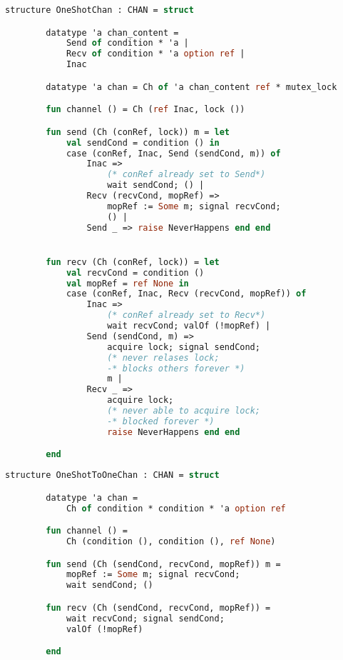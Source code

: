 \documentclass{article}
\begin{document}
    \begin{lstlisting}[language=ML, style=codestyle1]
        structure OneShotChan : CHAN = struct

        datatype 'a chan_content =
            Send of condition * 'a |
            Recv of condition * 'a option ref |
            Inac  

        datatype 'a chan = Ch of 'a chan_content ref * mutex_lock

        fun channel () = Ch (ref Inac, lock ())

        fun send (Ch (conRef, lock)) m = let
            val sendCond = condition () in
            case (conRef, Inac, Send (sendCond, m)) of
                Inac =>
                    (* conRef already set to Send*)
                    wait sendCond; () |
                Recv (recvCond, mopRef) =>
                    mopRef := Some m; signal recvCond;
                    () |
                Send _ => raise NeverHappens end end


        fun recv (Ch (conRef, lock)) = let
            val recvCond = condition ()
            val mopRef = ref None in
            case (conRef, Inac, Recv (recvCond, mopRef)) of
                Inac =>
                    (* conRef already set to Recv*)
                    wait recvCond; valOf (!mopRef) |
                Send (sendCond, m) =>
                    acquire lock; signal sendCond;
                    (* never relases lock;
                    -* blocks others forever *)
                    m |
                Recv _ =>
                    acquire lock;
                    (* never able to acquire lock;
                    -* blocked forever *)
                    raise NeverHappens end end

        end
    \end{lstlisting}

\begin{lstlisting}[language=ML, style=codestyle1]
    structure OneShotToOneChan : CHAN = struct

        datatype 'a chan =
            Ch of condition * condition * 'a option ref

        fun channel () =
            Ch (condition (), condition (), ref None)

        fun send (Ch (sendCond, recvCond, mopRef)) m =
            mopRef := Some m; signal recvCond;  
            wait sendCond; ()

        fun recv (Ch (sendCond, recvCond, mopRef)) =
            wait recvCond; signal sendCond;
            valOf (!mopRef)

        end
    \end{lstlisting}
\end{document}

